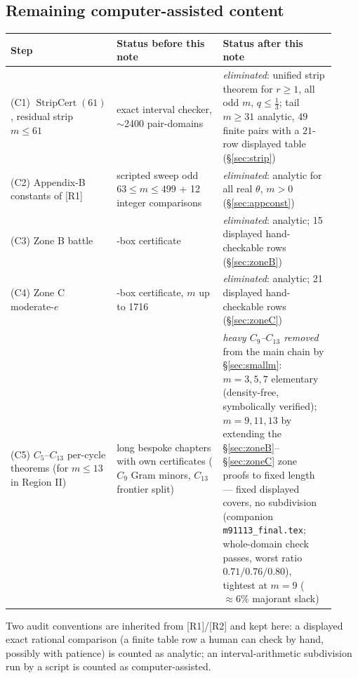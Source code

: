 \documentclass[11pt]{article}
\theoremstyle{remark}
\theoremstyle{plain}
\theoremstyle{plain}
\begin{document}
\subsection*{Remaining computer-assisted content}

\begin{center}
\small
\begin{tabular}{>{\raggedright\arraybackslash}p{0.30\linewidth}
                >{\raggedright\arraybackslash}p{0.30\linewidth}
                >{\raggedright\arraybackslash}p{0.32\linewidth}}
\toprule
Step & Status before this note & Status after this note \\
\midrule
(C1) $\operatorname{StripCert}(61)$, residual strip $m\le61$
& exact interval checker, $\sim$2400 pair-domains
& \emph{eliminated}: unified strip theorem for $r\ge1$, all odd $m$,
$q\le\tfrac13$; tail $m\ge31$ analytic, $49$ finite pairs with a
$21$-row displayed table (\S\ref{sec:strip}) \\
(C2) Appendix-B constants of [R1]
& scripted sweep odd $63\le m\le499$ + 12 integer comparisons
& \emph{eliminated}: analytic for all real $\theta$, $m>0$
(\S\ref{sec:appconst}) \\
(C3) Zone B battle
& 23-box certificate
& \emph{eliminated}: analytic; 15 displayed hand-checkable rows
(\S\ref{sec:zoneB}) \\
(C4) Zone C moderate-$e$
& 3001-box certificate, $m$ up to 1716
& \emph{eliminated}: analytic; 21 displayed hand-checkable rows
(\S\ref{sec:zoneC}) \\
(C5) $C_5$--$C_{13}$ per-cycle theorems (for $m\le13$ in Region II)
& long bespoke chapters with own certificates ($C_9$ Gram minors,
$C_{13}$ frontier split)
& \emph{heavy $C_9$--$C_{13}$ removed} from the main chain by
\S\ref{sec:smallm}: $m=3,5,7$ elementary (density-free, symbolically
verified); $m=9,11,13$ by extending the \S\ref{sec:zoneB}--\S\ref{sec:zoneC}
zone proofs to fixed length --- fixed displayed covers, no subdivision
(companion \texttt{m91113\_final.tex}; whole-domain check passes, worst
ratio $0.71/0.76/0.80$), tightest at $m=9$ ($\approx6\%$ majorant slack) \\
\bottomrule
\end{tabular}
\end{center}

Two audit conventions are inherited from [R1]/[R2] and kept here: a
displayed exact rational comparison (a finite table row a human can check
by hand, possibly with patience) is counted as analytic; an
interval-arithmetic subdivision run by a script is counted as
computer-assisted.
\end{document}
